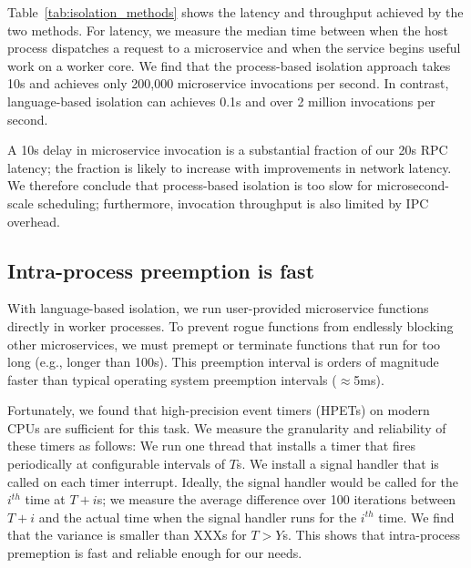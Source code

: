 Table~\ref{tab:isolation_methods} shows the latency and throughput achieved
by the two methods. For latency, we measure the median time between when the host
process dispatches a request to a microservice and when the service begins
useful work on a worker core. We find that the process-based isolation approach
takes 10\textmu{}s and achieves only 200,000 microservice invocations per
second. In contrast, language-based isolation can achieves 0.1\textmu{}s and
over 2 million invocations per second.


A 10\textmu{}s delay in microservice invocation is a substantial fraction of our
20\textmu{}s RPC latency;  the fraction is likely to increase with
improvements in network latency. We therefore conclude that process-based
isolation is too slow for microsecond-scale scheduling; furthermore, invocation
throughput is also limited by IPC overhead.

\subsection{Intra-process preemption is fast}
With language-based isolation, we run user-provided microservice functions
directly in worker processes. To prevent rogue functions from endlessly blocking
other microservices, we must premept or terminate functions that run for too
long (e.g., longer than 100\textmu{}s).  This
preemption interval is orders of magnitude faster than typical operating
system preemption intervals ($\approx$5ms).

Fortunately, we found that high-precision event timers (HPETs) on modern CPUs
are sufficient for this task. We measure the granularity and reliability of
these timers as follows: We run one thread that installs a timer that fires
periodically at configurable intervals of $T$\textmu{}s. We install a signal
handler that is called on each timer interrupt. Ideally, the signal handler
would be called for the $i^{th}$ time at $T + i$\textmu{}s; we measure the
average difference over 100 iterations between $T + i$ and the actual time
when the signal handler runs for the $i^{th}$ time. We find that the variance
is smaller than XXX\textmu{}s for $T > Y$\textmu{}s. This shows that
intra-process premeption is fast and reliable enough for our needs.
